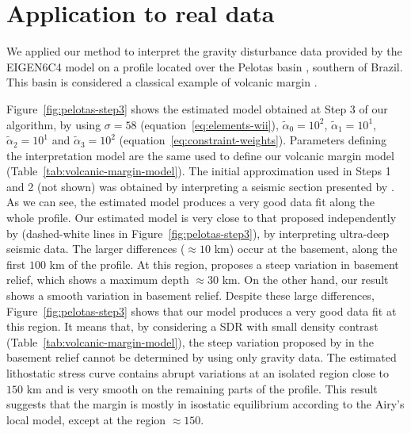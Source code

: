 \documentclass[manuscript]{geophysics}
\begin{document}
\section{Application to real data}

We applied our method to interpret the gravity disturbance data provided by the 
EIGEN6C4 model \citep{forste2014} on a profile located over the Pelotas basin
\citep{stica-etal2014}, southern of Brazil. This basin is 
considered a classical example of volcanic margin \citep{geoffroy2005}.

Figure~\ref{fig:pelotas-step3} shows the estimated model obtained at Step 3
of our algorithm, by using $\sigma = 58$ (equation~\ref{eq:elements-wii}), 
$\tilde{\alpha}_{0} = 10^{2}$, $\tilde{\alpha}_{1} = 10^{1}$, 
$\tilde{\alpha}_{2} = 10^{1}$ and $\tilde{\alpha}_{3} = 10^{2}$
(equation~\ref{eq:constraint-weights}).
Parameters defining the interpretation model are the same used
to define our volcanic margin model (Table~\ref{tab:volcanic-margin-model}).
The initial approximation used in Steps 1 and 2 (not shown) was obtained by 
interpreting a seismic section presented by \citet{stica-etal2014}.
As we can see, the estimated model produces a very good data fit along the whole
profile. Our estimated model is very close to that proposed independently by
\citet{zalan2015} (dashed-white lines in Figure~\ref{fig:pelotas-step3}), by
interpreting ultra-deep seismic data.
The larger differences ($\approx 10$ km) occur at the basement, along the first 
$100$ km of the profile.
At this region, \citeauthor{zalan2015} proposes a steep variation in basement
relief, which shows a maximum depth $\approx 30$ km. On the other hand, our result 
shows a smooth variation in basement relief. Despite these large differences,
Figure~\ref{fig:pelotas-step3} shows that our model produces a very good data fit
at this region. It means that, by considering a SDR with small density contrast 
(Table~\ref{tab:volcanic-margin-model}), the steep variation 
proposed by \citeauthor{zalan2015} in the basement relief cannot be determined by 
using only gravity data.
The estimated lithostatic stress curve contains abrupt variations
at an isolated region close to $150$ km and is very smooth on the remaining parts
of the profile. This result suggests that the margin is mostly in isostatic 
equilibrium according to the Airy's local model, except at the region $\approx 150$.
\end{document}
